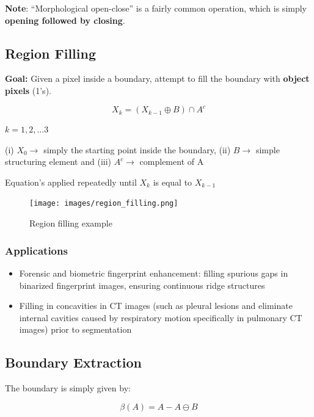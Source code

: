 \textbf{Note}: \enquote{Morphological open-close} is a fairly common operation, which is simply \textbf{opening followed by closing}.

\subsection*{Region Filling}

\textbf{Goal:} Given a pixel inside a boundary, attempt to fill the boundary with \textbf{object pixels} (1's).

\begin{equation*}
  X_k = (X_{k-1} \oplus B) \cap A^c
\end{equation*}

$k = 1, 2, \ldots 3$

(i) $X_0 \rightarrow$ simply the starting point inside the boundary, (ii) $B \rightarrow$ simple structuring element and (iii) $A^c \rightarrow$ complement of A

Equation's applied repeatedly until $X_k$ is equal to $X_{k-1}$

\begin{figure}[H]
  \centering
  \texttt{[image: images/region\_filling.png]}
  \caption{Region filling example}
\end{figure}

\subsubsection*{Applications}
\begin{itemize}
  \item Forensic and biometric fingerprint enhancement: filling spurious gaps in binarized fingerprint images, ensuring continuous ridge structures
  \item Filling in concavities in CT images (such as pleural lesions and eliminate internal cavities caused by respiratory motion specifically in pulmonary CT images) prior to segmentation
\end{itemize}

\subsection*{Boundary Extraction}

The boundary is simply given by:

\begin{equation*}
  \beta(A) = A - A \ominus B
\end{equation*}


